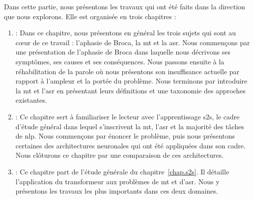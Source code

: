 Dans cette partie, nous présentons les travaux qui ont été faits dans la direction que nous explorons.
Elle est organisée en trois chapitres :
\begin{enumerate}[label={Chapitre \arabic*}]
    \item {} :    
    Dans ce chapitre, nous présentons en général les trois sujets qui sont au cœur de ce travail :
    l'aphasie de Broca, la \gls{mt} et la \gls{asr}.
    Nous commençons par une présentation de l'aphasie de Broca 
    dans laquelle nous décrivons ses symptômes, ses causes et ses conséquences.
    Nous passons ensuite à la réhabilitation de la parole où nous présentons son insuffisance actuelle
    par rapport à l'ampleur et la portée du problème.
    Nous terminons par introduire la \gls{mt} et l'\gls{asr} 
    en présentant leurs définitions et une taxonomie des approches existantes.
    
    \item {} :
    Ce chapitre sert à familiariser le lecteur avec l'apprentissage \gls{s2s},
    le cadre d'étude général dans lequel s'inscrivent la \gls{mt}, l'\gls{asr} et la majorité des tâches de \gls{nlp}.
    Nous commençons par énoncer le problème, 
    puis nous présentons certaines des architectures neuronales qui ont été appliquées dans son cadre.
    Nous clôturons ce chapitre par une comparaison de ces architectures.
    
    \item {} :    
    Ce chapitre part de l'étude générale du chapitre~\ref{chap.s2s}.
    Il détaille l'application du transformeur aux problèmes de \gls{mt} et d'\gls{asr}.
    Nous y présentons les travaux les plus importants dans ces deux domaines.
\end{enumerate}

\subsection*{}

